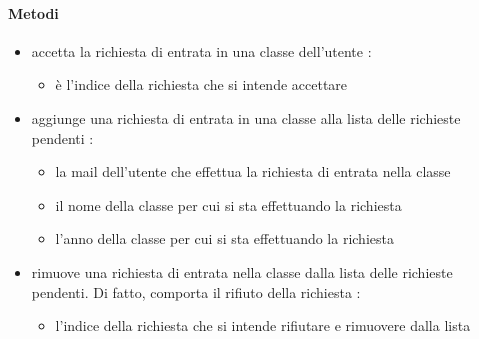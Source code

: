 \paragraph{Metodi}
\begin{itemize}
\item {}
\newline
accetta la richiesta di entrata in una classe dell'utente
\newline
{} :
\begin{itemize}
\item {}
\newline
è l'indice della richiesta che si intende accettare
\end{itemize}
\item {}
\newline
aggiunge una richiesta di entrata in una classe alla lista delle richieste pendenti
\newline
{} :
\begin{itemize}
\item {}
\newline
la mail dell'utente che effettua la richiesta di entrata nella classe
\item {}
\newline
il nome della classe per cui si sta effettuando la richiesta
\item {}
\newline
l'anno della classe per cui si sta effettuando la richiesta
\end{itemize}
\item {}
\newline
rimuove una richiesta di entrata nella classe dalla lista delle richieste pendenti. Di fatto, comporta il rifiuto della richiesta
\newline
{} :
\begin{itemize}
\item {}
\newline
l'indice della richiesta che si intende rifiutare e rimuovere dalla lista
\end{itemize}
\end{itemize}
